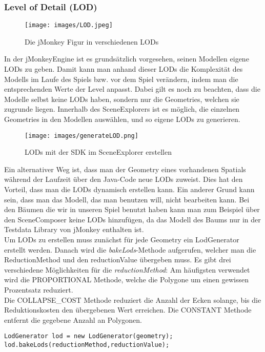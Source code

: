 \subsubsection{Level of Detail (LOD)}
\begin{figure}[h!]
	
	
	
	\centering\texttt{[image: images/LOD.jpeg]}
	\caption{Die jMonkey Figur in verschiedenen LODs}
	
\end{figure}  
In der jMonkeyEngine ist es grundsätzlich vorgesehen, seinen Modellen eigene LODs zu geben. Damit kann man anhand dieser LODs die Komplexität des Modells im Laufe des Spiels bzw. vor dem Spiel verändern, indem man die entsprechenden Werte der Level anpasst. Dabei gilt es noch zu beachten, dass die Modelle selbst keine LODs haben, sondern nur die Geometries, welchen sie zugrunde liegen. Innerhalb des SceneExplorers ist es möglich, die einzelnen Geometries in den Modellen auswählen, und so eigene LODs zu generieren.\\
\begin{figure}[H]
	
	
	\centering\texttt{[image: images/generateLOD.png]}
	\caption{LODs mit der SDK im SceneExplorer erstellen}
	
\end{figure} 
Ein alternativer Weg ist, dass man der Geometry eines vorhandenen Spatials während der Laufzeit über den Java-Code neue LODs zuweist. Dies hat den Vorteil, dass man die LODs dynamisch erstellen kann. Ein anderer Grund kann sein, dass man das Modell, das man benutzen will, nicht bearbeiten kann. Bei den Bäumen die wir in unseren Spiel benutzt haben kann man zum Beispiel über den SceneComposer keine LODs hinzufügen, da das Modell des Baums nur in der Testdata Library von jMonkey enthalten ist. \\
Um LODs zu erstellen muss zunächst für jede Geometry ein LodGenerator erstellt werden. Danach wird die \emph{bakeLods}-Methode aufgerufen, welcher man die ReductionMethod und den reductionValue übergeben muss. Es gibt drei verschiedene Möglichkeiten für die \emph{reductionMethod}: Am häufigsten verwendet wird die PROPORTIONAL Methode, welche die Polygone um einen gewissen Prozentsatz reduziert. \\
Die COLLAPSE\_COST Methode reduziert die Anzahl der Ecken solange, bis die Reduktionskosten den übergebenen Wert erreichen. Die CONSTANT Methode entfernt die gegebene Anzahl an Polygonen.
\begin{lstlisting}
LodGenerator lod = new LodGenerator(geometry);
lod.bakeLods(reductionMethod,reductionValue);
\end{lstlisting}

